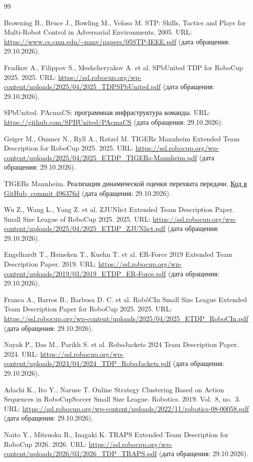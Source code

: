 \documentclass{misisarticle}
\begin{document}
\begin{thebibliography}{99}

 Browning B., Bruce J., Bowling M., Veloso M. STP: Skills, Tactics and Plays for Multi-Robot Control in Adversarial Environments. 2005. URL: \url{https://www.cs.cmu.edu/~mmv/papers/05STP-IEEE.pdf} (дата обращения: 29.10.2026).

 Fradkov A., Filippov S., Meshcheryakov A. et al. SPbUnited TDP for RoboCup 2025. 2025. URL: \url{https://ssl.robocup.org/wp-content/uploads/2025/04/2025_TDPSPbUnited.pdf} (дата обращения: 29.10.2026).

 SPbUnited. PAcmaCS: программная инфраструктура команды. URL: \url{https://github.com/SPBUnited/PAcmaCS} (дата обращения: 29.10.2026).

 Geiger M., Ommer N., Ryll A., Ratzel M. TIGERs Mannheim Extended Team Description for RoboCup 2025. 2025. URL: \url{https://ssl.robocup.org/wp-content/uploads/2025/04/2025_ETDP_TIGERs-Mannheim.pdf} (дата обращения: 29.10.2026).

 TIGERs Mannheim. Реализация динамической оценки перехвата передачи. \href{https://github.com/TIGERs-Mannheim/Sumatra/blob/496376d77d9e208736257f4410ad1dd5ca9cf72d/modules/moduli-ai/src/main/java/edu/tigers/sumatra/ai/metis/pass/rating/DynamicPassInterceptionMovingRobotRater.java}{Код в GitHub, commit 496376d} (дата обращения: 29.10.2026).

 Wu Z., Wang L., Yang Z. et al. ZJUNlict Extended Team Description Paper. Small Size League of RoboCup 2025. 2025. URL: \url{https://ssl.robocup.org/wp-content/uploads/2025/04/2025_ETDP_ZJUNlict.pdf} (дата обращения: 29.10.2026).

 Engelhardt T., Heineken T., Kuehn T. et al. ER-Force 2019 Extended Team Description Paper. 2019. URL: \url{https://ssl.robocup.org/wp-content/uploads/2019/03/2019_ETDP_ER-Force.pdf} (дата обращения: 29.10.2026).

 Franca A., Barros B., Barbosa D. C. et al. RobôCIn Small Size League Extended Team Description Paper for RoboCup 2025. 2025. URL: \url{https://ssl.robocup.org/wp-content/uploads/2025/04/2025_ETDP_RoboCIn.pdf} (дата обращения: 29.10.2026).

 Nayak P., Das M., Parikh S. et al. RoboJackets 2024 Team Description Paper. 2024. URL: \url{https://ssl.robocup.org/wp-content/uploads/2024/04/2024_TDP_RoboJackets.pdf} (дата обращения: 29.10.2026).

 Adachi K., Ito Y., Naruse T. Online Strategy Clustering Based on Action Sequences in RoboCupSoccer Small Size League. Robotics. 2019. Vol.~8, no.~3. URL: \url{https://ssl.robocup.org/wp-content/uploads/2022/11/robotics-08-00058.pdf} (дата обращения: 29.10.2026).

 Naito Y., Mitsuoka R., Inagaki K. TRAPS Extended Team Description for RoboCup 2026. 2026. URL: \url{https://ssl.robocup.org/wp-content/uploads/2026/03/2026_TDP_TRAPS.pdf} (дата обращения: 29.10.2026).

\end{thebibliography}
\end{document}
